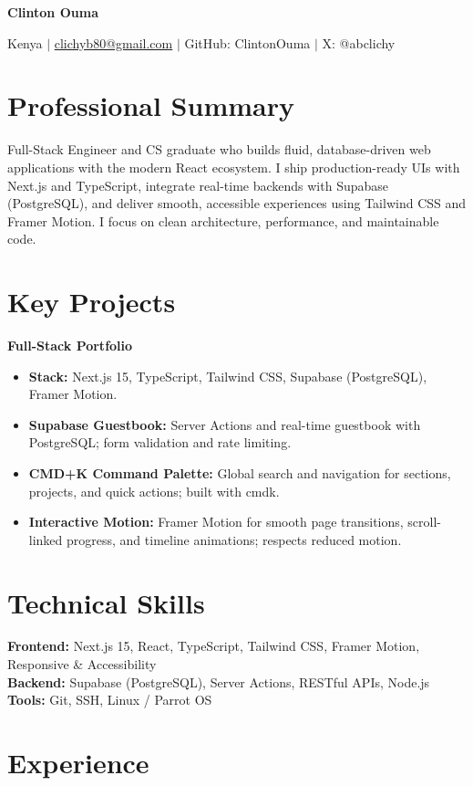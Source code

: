 \documentclass[11pt,a4paper]{article}
\newcommand{\name}[1]{\begin{center}\LARGE\bfseries #1\end{center}}
\newcommand{\contact}[1]{\begin{center}\normalsize #1\end{center}\vspace{0.3em}}
\begin{document}
\name{Clinton Ouma}
\contact{Kenya \quad $|$ \quad \href{mailto:clichyb80@gmail.com}{clichyb80@gmail.com} \quad $|$ \quad GitHub: ClintonOuma \quad $|$ \quad X: @abclichy}

\vspace{0.5em}

\section*{Professional Summary}
Full-Stack Engineer and CS graduate who builds fluid, database-driven web applications with the modern React ecosystem. I ship production-ready UIs with Next.js and TypeScript, integrate real-time backends with Supabase (PostgreSQL), and deliver smooth, accessible experiences using Tailwind CSS and Framer Motion. I focus on clean architecture, performance, and maintainable code.

\section*{Key Projects}

\textbf{Full-Stack Portfolio}
\begin{itemize}
  \item \textbf{Stack:} Next.js 15, TypeScript, Tailwind CSS, Supabase (PostgreSQL), Framer Motion.
  \item \textbf{Supabase Guestbook:} Server Actions and real-time guestbook with PostgreSQL; form validation and rate limiting.
  \item \textbf{CMD+K Command Palette:} Global search and navigation for sections, projects, and quick actions; built with cmdk.
  \item \textbf{Interactive Motion:} Framer Motion for smooth page transitions, scroll-linked progress, and timeline animations; respects reduced motion.
\end{itemize}

\section*{Technical Skills}

\textbf{Frontend:} Next.js 15, React, TypeScript, Tailwind CSS, Framer Motion, Responsive \& Accessibility\\
\textbf{Backend:} Supabase (PostgreSQL), Server Actions, RESTful APIs, Node.js\\
\textbf{Tools:} Git, SSH, Linux / Parrot OS

\section*{Experience}
\end{document}
